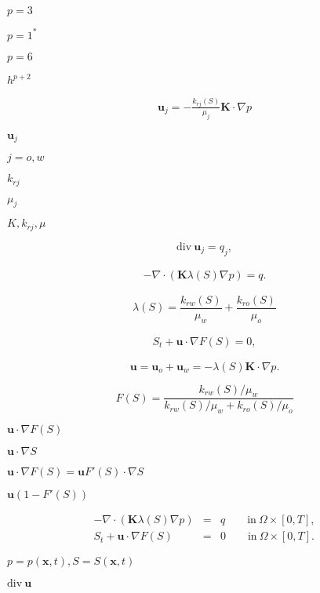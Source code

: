 \documentclass{article}
\begin{document}
$p=3$
\pagebreak

$p=1^*$
\pagebreak

$p=6$
\pagebreak

$h^{p+2}$
\pagebreak

\begin{eqnarray*} \mathbf{u}_{j} = -\frac{k_{rj}(S)}{\mu_{j}} \mathbf{K} \cdot \nabla p \end{eqnarray*}
\pagebreak

$\mathbf{u}_{j}$
\pagebreak

$j=o,w$
\pagebreak

$k_{rj}$
\pagebreak

$\mu_{j}$
\pagebreak

$K, k_{rj}, \mu$
\pagebreak

\[ \textrm{div}\ \mathbf{u}_{j} = q_j, \]
\pagebreak

\begin{eqnarray*} - \nabla \cdot (\mathbf{K}\lambda(S) \nabla p)= q. \end{eqnarray*}
\pagebreak

\[ \lambda(S) = \frac{k_{rw}(S)}{\mu_{w}}+\frac{k_{ro}(S)}{\mu_{o}} \]
\pagebreak

\begin{eqnarray*} S_{t} + \mathbf{u} \cdot \nabla F(S) = 0, \end{eqnarray*}
\pagebreak

\[ \mathbf{u} = \mathbf{u}_{o} + \mathbf{u}_{w} = -\lambda(S) \mathbf{K}\cdot\nabla p. \]
\pagebreak

\[ F(S) = \frac{k_{rw}(S)/\mu_{w}}{k_{rw}(S)/\mu_{w} + k_{ro}(S)/\mu_{o}} \]
\pagebreak

$\mathbf{u} \cdot \nabla F(S)$
\pagebreak

$\mathbf{u} \cdot \nabla S$
\pagebreak

$\mathbf{u} \cdot \nabla F(S) = \mathbf{u} F'(S) \cdot \nabla S$
\pagebreak

$\mathbf u (1-F'(S))$
\pagebreak

\begin{eqnarray*} - \nabla \cdot (\mathbf{K}\lambda(S) \nabla p) &=& q \qquad \textrm{in}\ \Omega\times[0,T], \\ S_{t} + \mathbf{u} \cdot \nabla F(S) &=& 0 \qquad \textrm{in}\ \Omega\times[0,T]. \end{eqnarray*}
\pagebreak

$p=p(\mathbf x, t), S=S(\mathbf x, t)$
\pagebreak

$\textrm{div}\ \mathbf u$
\pagebreak
\end{document}
